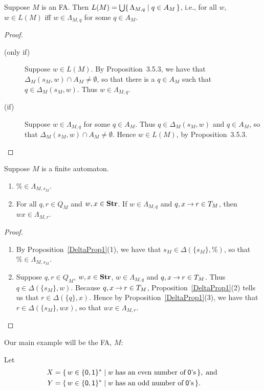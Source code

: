\begin{proposition}
\label{LambdaProp1}
Suppose $M$ is an FA.  Then $L(M) = \bigcup\{ \, \Lambda_{M,q} \mid q\in
  A_M \, \}$, i.e., for all $w$, $w\in L(M)$ iff $w\in\Lambda_{M,q}$ for
some $q\in A_M$.
\end{proposition}

\begin{proof}
\begin{description}
\item[\quad(only if)] Suppose $w\in L(M)$.  By Proposition~3.5.3,
we have that $\Delta_M({s_M},w)\cap A_M\neq\emptyset$, so that there
is a $q\in A_M$ such that $q\in\Delta_M({s_M},w)$.  Thus
$w\in\Lambda_{M,q}$.

\item[\quad(if)] Suppose $w\in\Lambda_{M,q}$ for some $q\in A_M$.
Thus $q\in\Delta_M({s_M},w)$ and $q\in A_M$, so that
$\Delta_M({s_M},w)\cap A_M\neq\emptyset$.  Hence $w\in L(M)$, by
Proposition~3.5.3.
\end{description}
\end{proof}

\begin{proposition}
\label{LambdaProp2}
Suppose $M$ is a finite automaton.
\begin{enumerate}[\quad(1)]
\item $\%\in\Lambda_{M,s_M}$.

\item For all $q,r\in Q_M$ and $w,x\in\mathbf{Str}$.  If $w\in\Lambda_{M,q}$
  and ${q,x\mathbin{\to} r}\in T_M$, then $wx\in\Lambda_{M,r}$.
\end{enumerate}
\end{proposition}

\begin{proof}
\begin{enumerate}[(1)]
\item By Proposition~\ref{DeltaProp1}(1), we have
  that $s_M\in\Delta(\{s_M\},\%)$, so that $\%\in\Lambda_{M,s_M}$.

\item Suppose $q,r\in Q_M$, $w,x\in\mathbf{Str}$, $w\in\Lambda_{M,q}$ and
  $q,x\mathbin{\to} r\in T_M$.  Thus $q\in\Delta(\{s_M\},w)$.  Because
  ${q,x\mathbin{\to} r}\in T_M$, Proposition~\ref{DeltaProp1}(2) tells us that
  $r\in\Delta(\{q\},x)$.  Hence by Proposition~\ref{DeltaProp1}(3), we
  have that ${r}\in\Delta(\{s_M\},wx)$, so that
  ${wx}\in\Lambda_{M,{r}}$.
\end{enumerate}
\end{proof}

Our main example will be the FA, $M$:
\begin{center}

\end{center}
Let
\begin{align*}
X &= \{ \, w\in\{\mathsf{0,1}\}^* \mid w\;\allowbreak\mbox{has an even number of}\allowbreak\;
\mathsf{0}\allowbreak\mbox{'s}\allowbreak \, \} , \;\allowbreak\mbox{and}\allowbreak\; \\
Y &= \{ \, w\in\{\mathsf{0,1}\}^* \mid w\;\allowbreak\mbox{has an odd number of}\allowbreak\;
\mathsf{0}\allowbreak\mbox{'s}\allowbreak \, \} .
\end{align*}

